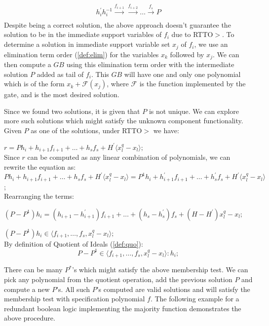\begin{align}
h_i^{'}h_i^{-1}\xrightarrow[]{f_{i+1}}\xrightarrow[]{f_{i+2}}\dots\xrightarrow[]{f_s}P
\end{align}
Despite being a correct solution, the above approach doesn't guarantee the solution to be in the immediate support variables of $f_i$ due to RTTO$>$. To determine a solution in immediate support variable set $x_j$ of $f_i$, we use an elimination term order (\autoref{def:elim}) for the variables $x_k$ followed by $x_j$. We can then compute a $GB$ using this elimination term order with the intermediate solution $P$ added as tail of $f_i$. This $GB$ will have one and only one polynomial which is of the form $x_k + \mathcal{F}(x_j)$, where $\mathcal{F}$ is the function implemented by the gate, and is the most desired solution. 

Since we found two solutions, it is given that $P$ is not unique. We can explore more such solutions which might satisfy the unknown component functionality. Given $P$ as one of the solutions, under RTTO$>$ we have:

$r = Ph_i+h_{i+1}f_{i+1}+\dots+h_sf_s+H^{'}\langle x_l^q-x_l\rangle;$\\
Since $r$ can be computed as any linear combination of polynomials, we can rewrite the equation as:\\
$Ph_i+h_{i+1}f_{i+1}+\dots+h_sf_s+H^{'}\langle x_l^q-x_l\rangle = P^{1}h_i+h_{i+1}^{'}f_{i+1}+\dots+h_s^{'}f_s+H^{'}\langle x_l^q-x_l\rangle$;\\
Rearranging the terms:

$(P-P^{1})h_i = (h_{i+1}-h_{i+1}^{'})f_{i+1}+\dots+(h_{s}-h_{s}^{'})f_s+(H-H^{'})x_l^q-x_l;$

$(P-P^{1})h_i \in \langle f_{i+1},\dots,f_s,x_l^q-x_l\rangle;$\\
By definition of Quotient of Ideals (\autoref{def:quo}):
\vspace{0.1in}
\begin{equation}
\label{quotcomp}
P-P^{1} \in \langle f_{i+1},\dots,f_s,x_l^q-x_l\rangle:h_i;
\end{equation}

There can be many $P^{*}$'s which might satisfy the above membership test. We can pick any polynomial from the quotient operation, add the previous solution $P$ and compute a new $P$'s. All such $P$'s computed are valid solutions and will satisfy the membership test with specification polynomial $f$. The following example for a redundant boolean logic implementing the majority function demonstrates the above procedure.

